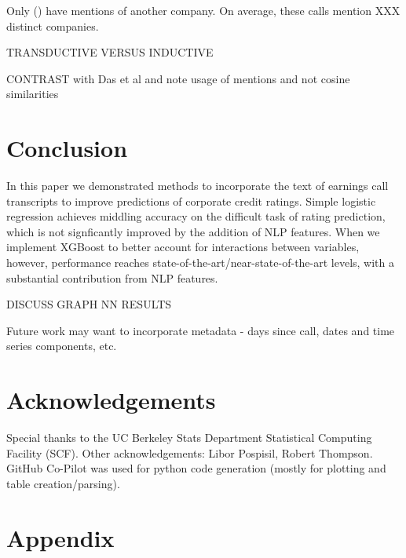 \documentclass{article}[11pt]
\begin{document}
    Only \noCallsWithNonSelfMentions \space (\shareCallsWithNonSelfMentions \space) have mentions of another company. On average, these calls  mention XXX distinct companies.

    TRANSDUCTIVE VERSUS INDUCTIVE

    CONTRAST with Das et al \cite{das_credit_2023} and note usage of mentions and not cosine similarities

    \section*{Conclusion}

    In this paper we demonstrated methods to incorporate the text of earnings call transcripts to improve predictions of corporate credit ratings. Simple logistic regression achieves middling accuracy on the difficult task of rating prediction, which is not signficantly improved by the addition of NLP features. When we implement XGBoost to better account for interactions between variables, however, performance reaches state-of-the-art/near-state-of-the-art levels, with a substantial contribution from NLP features.

    DISCUSS GRAPH NN RESULTS

    Future work may want to incorporate metadata - days since call, dates and time series components, etc.

    \section*{Acknowledgements}

    Special thanks to the UC Berkeley Stats Department Statistical Computing Facility (SCF). Other acknowledgements: Libor Pospisil, Robert Thompson. GitHub Co-Pilot was used for python code generation (mostly for plotting and table creation/parsing).

    \clearpage
    \newpage

    
    

    \clearpage
    \newpage

    \appendix


    \section{Appendix}
\end{document}
